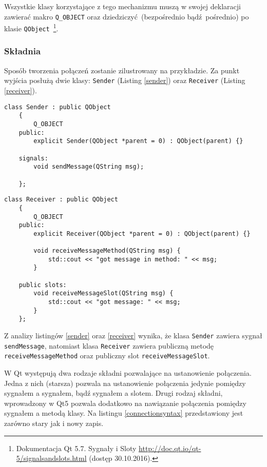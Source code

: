 Wszystkie klasy korzystające z tego mechanizmu muszą w swojej deklaracji zawierać makro \lstinline$Q_OBJECT$ oraz dziedziczyć (bezpośrednio bądź pośrednio) po klasie \lstinline$QObject$~\footnote{Dokumentacja Qt 5.7. Sygnały i Sloty \url{http://doc.qt.io/qt-5/signalsandslots.html} (dostęp 30.10.2016).}.


\subsubsection{Składnia} 
Sposób tworzenia połączeń zostanie zilustrowany na przykładzie. Za punkt wyjścia posłużą dwie klasy: \lstinline$Sender$ (Listing \ref{sender}) oraz \lstinline$Receiver$ (Listing \ref{receiver}).

\begin{minipage}{\textwidth}
	\begin{lstlisting}[label=sender,caption=Klasa Sender]
	class Sender : public QObject
	{
		Q_OBJECT
	public:
		explicit Sender(QObject *parent = 0) : QObject(parent) {}
		
	signals:
		void sendMessage(QString msg);
		
	};
	\end{lstlisting}
\end{minipage}

\begin{minipage}{\textwidth}
	\begin{lstlisting}[label=receiver, caption=Klasa Receiver]
	class Receiver : public QObject
	{
		Q_OBJECT
	public:
		explicit Receiver(QObject *parent = 0) : QObject(parent) {}
		
		void receiveMessageMethod(QString msg) {
			std::cout << "got message in method: " << msg;
		}
		
	public slots:
		void receiveMessageSlot(QString msg) {
			std::cout << "got message: " << msg;
		}
	};
	\end{lstlisting}
\end{minipage}

Z analizy listingów \ref{sender} oraz \ref{receiver} wynika, że klasa \lstinline{Sender} zawiera sygnał \lstinline{sendMessage}, natomiast klasa \lstinline{Receiver} zawiera publiczną metodę \lstinline{receiveMessageMethod} oraz publiczny slot \lstinline{receiveMessageSlot}.

W Qt występują dwa rodzaje składni pozwalające na ustanowienie połączenia. Jedna z nich (starsza) pozwala na ustanowienie połączenia jedynie pomiędzy sygnałem a sygnałem, bądź sygnałem a slotem. Drugi rodzaj składni, wprowadzony w Qt5 pozwala dodatkowo na nawiązanie połączenia pomiędzy sygnałem a metodą klasy. Na listingu \ref{connectionsyntax} przedstawiony jest zarówno stary jak i nowy zapis.

